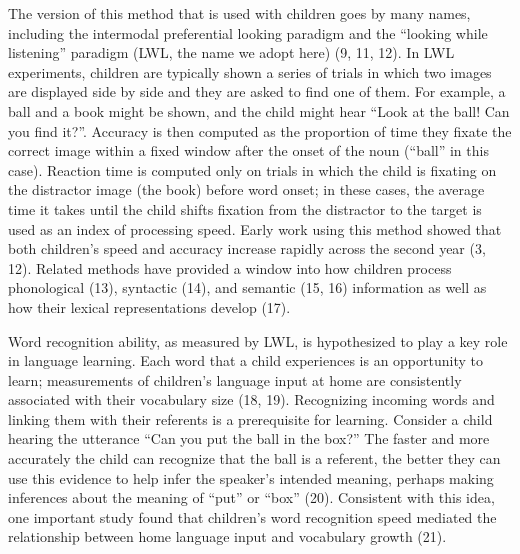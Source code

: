 \documentclass[9pt,twocolumn,twoside,]{pnas-new}
\begin{document}
The version of this method that is used with children goes by many
names, including the intermodal preferential looking paradigm and the
``looking while listening'' paradigm (LWL, the name we adopt here) (9,
11, 12). In LWL experiments, children are typically shown a series of
trials in which two images are displayed side by side and they are asked
to find one of them. For example, a ball and a book might be shown, and
the child might hear ``Look at the ball! Can you find it?''. Accuracy is
then computed as the proportion of time they fixate the correct image
within a fixed window after the onset of the noun (``ball'' in this
case). Reaction time is computed only on trials in which the child is
fixating on the distractor image (the book) before word onset; in these
cases, the average time it takes until the child shifts fixation from
the distractor to the target is used as an index of processing speed.
Early work using this method showed that both children's speed and
accuracy increase rapidly across the second year (3, 12). Related
methods have provided a window into how children process phonological
(13), syntactic (14), and semantic (15, 16) information as well as how
their lexical representations develop (17).

Word recognition ability, as measured by LWL, is hypothesized to play a
key role in language learning. Each word that a child experiences is an
opportunity to learn; measurements of children's language input at home
are consistently associated with their vocabulary size (18, 19).
Recognizing incoming words and linking them with their referents is a
prerequisite for learning. Consider a child hearing the utterance ``Can
you put the ball in the box?'' The faster and more accurately the child
can recognize that the ball is a referent, the better they can use this
evidence to help infer the speaker's intended meaning, perhaps making
inferences about the meaning of ``put'' or ``box'' (20). Consistent with
this idea, one important study found that children's word recognition
speed mediated the relationship between home language input and
vocabulary growth (21).
\end{document}
